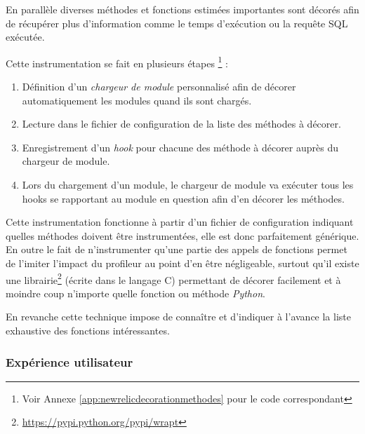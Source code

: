 En parallèle diverses méthodes et fonctions estimées importantes sont décorés afin de récupérer plus d'information comme le temps d'exécution ou la requête SQL exécutée.

Cette instrumentation se fait en plusieurs étapes \footnote{Voir Annexe \vref{app:newrelicdecorationmethodes} pour le code correspondant} :
\begin{enumerate}
  \item Définition d'un \emph{\gls{chargeur de module}} personnalisé afin de décorer automatiquement les modules quand ils sont chargés.
  \item Lecture dans le fichier de configuration de la liste des méthodes à décorer.
  \item Enregistrement d'un \emph{\gls{hook}} pour chacune des méthode à décorer auprès du chargeur de module.
  \item Lors du chargement d'un module, le chargeur de module va exécuter tous les hooks se rapportant au module en question afin d'en décorer les méthodes.
\end{enumerate}

Cette instrumentation fonctionne à partir d'un fichier de configuration indiquant quelles méthodes doivent être instrumentées, elle est donc parfaitement générique. En outre le fait de n'instrumenter qu'une partie des appels de fonctions permet de l'imiter l'impact du profileur au point d'en être négligeable, surtout qu'il existe une librairie\footnote{\url{https://pypi.python.org/pypi/wrapt}} (écrite dans le langage C) permettant de décorer facilement et à moindre coup n'importe quelle fonction ou méthode \emph{Python}.

En revanche cette technique impose de connaître et d'indiquer à l'avance la liste exhaustive des fonctions intéressantes.

  \subsubsection{Expérience utilisateur}
